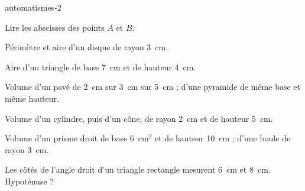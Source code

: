 \begin{blocEdition}{automatismes-2}
\begin{deuxcolonnes}\begin{questions}
\item \begin{minipage}[t]{\linewidth}\raggedright\leavevmode Lire les abscisses des points $A$ et $B$.\par\smallskip{}\end{minipage}
\item \begin{minipage}[t]{\linewidth}\raggedright\leavevmode Périmètre et aire d’un disque de rayon 3~cm.\end{minipage}
\item \begin{minipage}[t]{\linewidth}\raggedright\leavevmode Aire d’un triangle de base 7~cm et de hauteur 4~cm.\end{minipage}
\item \begin{minipage}[t]{\linewidth}\raggedright\leavevmode Volume d’un pavé de 2~cm sur 3~cm sur 5~cm ; d’une pyramide de même base et même hauteur.\end{minipage}
\item \begin{minipage}[t]{\linewidth}\raggedright\leavevmode Volume d’un cylindre, puis d’un cône, de rayon 2~cm et de hauteur 5~cm.\end{minipage}
\item \begin{minipage}[t]{\linewidth}\raggedright\leavevmode Volume d’un prisme droit de base 6~cm$^2$ et de hauteur 10~cm ; d’une boule de rayon 3~cm.\end{minipage}
\item \begin{minipage}[t]{\linewidth}\raggedright\leavevmode Les côtés de l’angle droit d’un triangle rectangle mesurent 6~cm et 8~cm. Hypoténuse ?\end{minipage}

\end{questions}
\end{deuxcolonnes}
\end{blocEdition}
